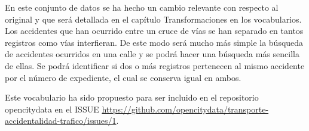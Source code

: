 En este conjunto de datos se ha hecho un cambio relevante con respecto al original y que será detallada en el capítulo Transformaciones en los vocabularios. Los accidentes que han ocurrido entre un cruce de vías se han separado en tantos registros como vías interfieran. De este modo será mucho más simple la búsqueda de accidentes ocurridos en una calle y se podrá hacer una búsqueda más sencilla de ellas. Se podrá identificar si dos o más registros pertenecen al mismo accidente por el número de expediente, el cual se conserva igual en ambos.

Este vocabulario ha sido propuesto para ser incluido en el repositorio opencitydata en el ISSUE \url{https://github.com/opencitydata/transporte-accidentalidad-trafico/issues/1}.




